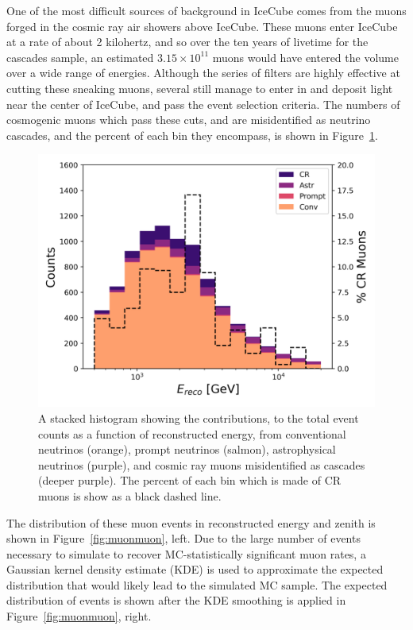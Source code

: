\documentclass[main.tex]{subfiles}
\begin{document}
One of the most difficult sources of background in IceCube comes from the muons forged in the cosmic ray air showers above IceCube. 
These muons enter IceCube at a rate of about 2 kilohertz, and so over the ten years of livetime for the cascades sample, an estimated $3.15\times 10^{11}$ muons would have entered the volume over a wide range of energies. 
Although the series of filters are highly effective at cutting these sneaking muons, several still manage to enter in and deposit light near the center of IceCube, and pass the event selection criteria. 
The numbers of cosmogenic muons which pass these cuts, and are misidentified as neutrino cascades, and the percent of each bin they encompass, is shown in Figure~\ref{fig:muonperc}.

\begin{figure}
    \centering
    \includegraphics[width=0.8\linewidth]{figures/expectation_stacked.png}
    \caption{A stacked histogram showing the contributions,  to the total event counts as a function of reconstructed energy, from conventional neutrinos (orange), prompt neutrinos (salmon), astrophysical neutrinos (purple), and cosmic ray muons misidentified as cascades (deeper purple). The percent of each bin which is made of CR muons is show as a black dashed line.}\label{fig:muonperc}
\end{figure}

The distribution of these muon events in reconstructed energy and zenith is shown in Figure~\ref{fig:muonmuon}, left.
Due to the large number of events necessary to simulate to recover MC-statistically significant muon rates, a Gaussian kernel density estimate (KDE) is used to approximate the expected distribution that would likely lead to the simulated MC sample. 
The expected distribution of events is shown after the KDE smoothing is applied in Figure~\ref{fig:muonmuon}, right. 
\end{document}
